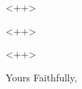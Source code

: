 \documentclass[12pt,a4paper]{letter}
\begin{document}
\begin{letter}{<++>}
\opening{<++>}

<++>

\closing{Yours Faithfully,}

\end{letter}
\end{document}
